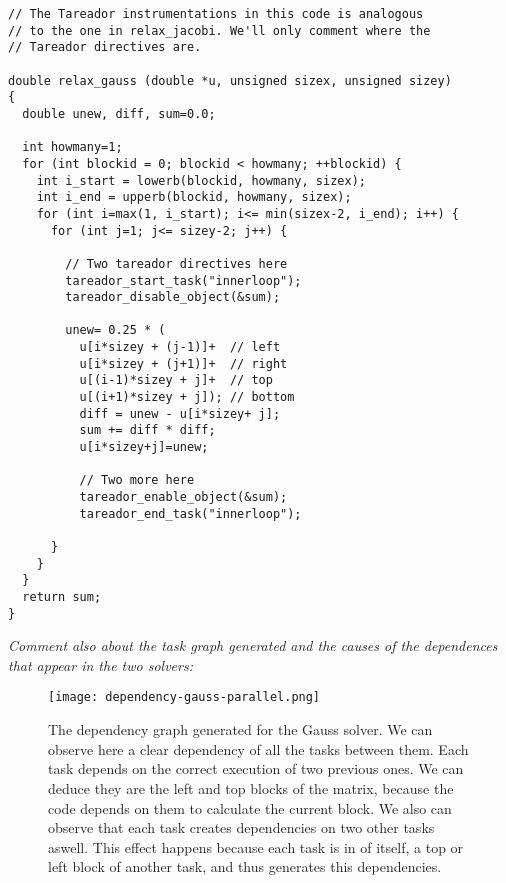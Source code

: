 \documentclass{report}
\begin{document}
\vspace{1cm}

\begin{lstlisting}[style=C2]
// The Tareador instrumentations in this code is analogous
// to the one in relax_jacobi. We'll only comment where the
// Tareador directives are.

double relax_gauss (double *u, unsigned sizex, unsigned sizey)
{
  double unew, diff, sum=0.0;

  int howmany=1;
  for (int blockid = 0; blockid < howmany; ++blockid) {
    int i_start = lowerb(blockid, howmany, sizex);
    int i_end = upperb(blockid, howmany, sizex);
    for (int i=max(1, i_start); i<= min(sizex-2, i_end); i++) {
      for (int j=1; j<= sizey-2; j++) {

        // Two tareador directives here
        tareador_start_task("innerloop");
        tareador_disable_object(&sum);

        unew= 0.25 * (
          u[i*sizey	+ (j-1)]+  // left
          u[i*sizey	+ (j+1)]+  // right
          u[(i-1)*sizey	+ j]+  // top
          u[(i+1)*sizey	+ j]); // bottom
          diff = unew - u[i*sizey+ j];
          sum += diff * diff;
          u[i*sizey+j]=unew;

          // Two more here
          tareador_enable_object(&sum);
          tareador_end_task("innerloop");

      }
    }
  }
  return sum;
}

\end{lstlisting}

\vspace{1cm}

\emph{Comment also about the task graph generated and the causes of the dependences that appear in the two solvers:}
\begin{SCfigure}[][ht]
  \caption{The dependency graph generated for the Gauss solver. We can observe here a clear dependency of all the tasks between them. Each task depends on the correct execution of two previous ones. We can deduce they are the left and top blocks of the matrix, because the code depends on them to calculate the current block. We also can observe that each task creates dependencies on two other tasks aswell. This effect happens because each task is in of itself, a top or left block of another task, and thus generates this dependencies.}

  \texttt{[image: dependency-gauss-parallel.png]}
\end{SCfigure}
\end{document}
